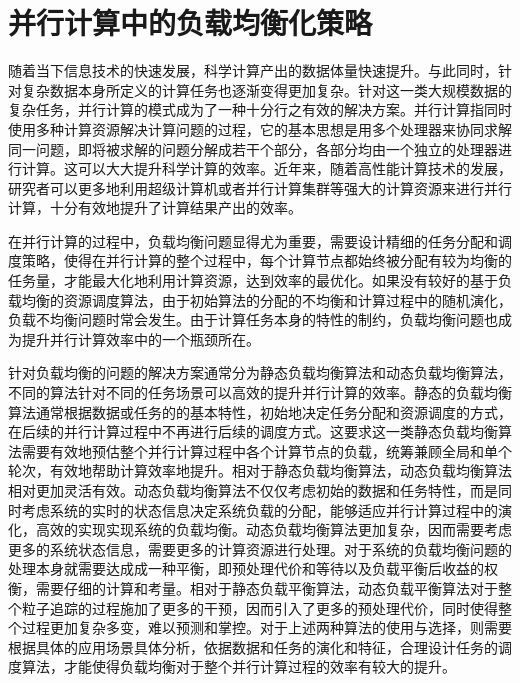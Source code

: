\section{并行计算中的负载均衡化策略}
随着当下信息技术的快速发展，科学计算产出的数据体量快速提升。与此同时，针对复杂数据本身所定义的计算任务也逐渐变得更加复杂。针对这一类大规模数据的复杂任务，并行计算的模式成为了一种十分行之有效的解决方案。并行计算指同时使用多种计算资源解决计算问题的过程，它的基本思想是用多个处理器来协同求解同一问题，即将被求解的问题分解成若干个部分，各部分均由一个独立的处理器进行计算。这可以大大提升科学计算的效率。近年来，随着高性能计算技术的发展，研究者可以更多地利用超级计算机或者并行计算集群等强大的计算资源来进行并行计算，十分有效地提升了计算结果产出的效率。

在并行计算的过程中，负载均衡问题显得尤为重要，需要设计精细的任务分配和调度策略，使得在并行计算的整个过程中，每个计算节点都始终被分配有较为均衡的任务量，才能最大化地利用计算资源，达到效率的最优化。如果没有较好的基于负载均衡的资源调度算法，由于初始算法的分配的不均衡和计算过程中的随机演化，负载不均衡问题时常会发生。由于计算任务本身的特性的制约，负载均衡问题也成为提升并行计算效率中的一个瓶颈所在。

针对负载均衡的问题的解决方案通常分为静态负载均衡算法和动态负载均衡算法，不同的算法针对不同的任务场景可以高效的提升并行计算的效率。静态的负载均衡算法通常根据数据或任务的的基本特性，初始地决定任务分配和资源调度的方式，在后续的并行计算过程中不再进行后续的调度方式。这要求这一类静态负载均衡算法需要有效地预估整个并行计算过程中各个计算节点的负载，统筹兼顾全局和单个轮次，有效地帮助计算效率地提升。相对于静态负载均衡算法，动态负载均衡算法相对更加灵活有效。动态负载均衡算法不仅仅考虑初始的数据和任务特性，而是同时考虑系统的实时的状态信息决定系统负载的分配，能够适应并行计算过程中的演化，高效的实现实现系统的负载均衡。动态负载均衡算法更加复杂，因而需要考虑更多的系统状态信息，需要更多的计算资源进行处理。对于系统的负载均衡问题的处理本身就需要达成成一种平衡，即预处理代价和等待以及负载平衡后收益的权衡，需要仔细的计算和考量。相对于静态负载平衡算法，动态负载平衡算法对于整个粒子追踪的过程施加了更多的干预，因而引入了更多的预处理代价，同时使得整个过程更加复杂多变，难以预测和掌控。对于上述两种算法的使用与选择，则需要根据具体的应用场景具体分析，依据数据和任务的演化和特征，合理设计任务的调度算法，才能使得负载均衡对于整个并行计算过程的效率有较大的提升。

